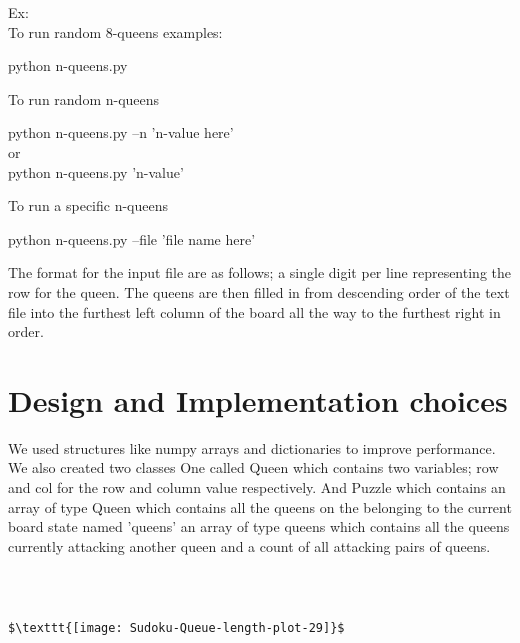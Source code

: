 \documentclass{article}
\begin{document}
Ex:
\\
To run random 8-queens examples: 
\begin{center}
python n-queens.py
\end{center}
To run random n-queens
\begin{center}
python n-queens.py --n 'n-value here'\\
or\\
python n-queens.py 'n-value'
\end{center}
To run a specific n-queens
\begin{center}
python n-queens.py --file 'file name here'
\end{center}
The format for the input file are as follows; a single digit per line representing the row for the queen. The queens are then filled in from descending order of the text file into the furthest left column of the board all the way to the furthest right in order. 

\section{Design and Implementation choices}
 We used structures like numpy arrays and dictionaries to improve performance. We also created two classes One called Queen which contains two variables; row and col for the row and column value respectively. And Puzzle which contains an array of type Queen which contains all the queens on the belonging to the current board state named 'queens' an array of type queens which contains all the queens currently attacking another queen and a count of all attacking pairs of queens.

\begin{verbatim}



$\texttt{[image: Sudoku-Queue-length-plot-29]}$


\end{verbatim}
\end{document}
